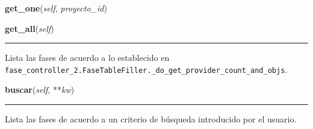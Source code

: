 \hspace{.8\funcindent}\begin{boxedminipage}{\funcwidth}

    \raggedright \textbf{get\_one}(\textit{self}, \textit{proyecto\_id})

\setlength{\parskip}{2ex}
\setlength{\parskip}{1ex}
    \end{boxedminipage}

    \label{saip:controllers:fase_controller_2:FaseControllerNuevo:get_all}

    \vspace{0.5ex}

\hspace{.8\funcindent}\begin{boxedminipage}{\funcwidth}

    \raggedright \textbf{get\_all}(\textit{self})

    \vspace{-1.5ex}

    \rule{\textwidth}{0.5\fboxrule}
\setlength{\parskip}{2ex}
    Lista las fases de acuerdo a lo establecido en 
    \texttt{fase\_controller\_2.FaseTableFiller.\_do\_get\_provider\_count\_and\_objs}.

\setlength{\parskip}{1ex}
    \end{boxedminipage}

    \label{saip:controllers:fase_controller_2:FaseControllerNuevo:buscar}

    \vspace{0.5ex}

\hspace{.8\funcindent}\begin{boxedminipage}{\funcwidth}

    \raggedright \textbf{buscar}(\textit{self}, **\textit{kw})

    \vspace{-1.5ex}

    \rule{\textwidth}{0.5\fboxrule}
\setlength{\parskip}{2ex}
    Lista las fases de acuerdo a un criterio de búsqueda introducido por el
    usuario.

\setlength{\parskip}{1ex}
    \end{boxedminipage}

